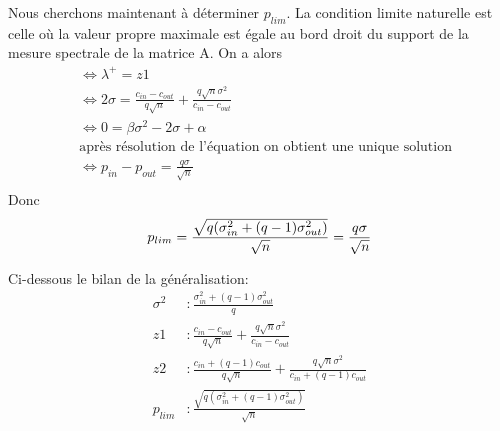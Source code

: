 Nous cherchons maintenant à déterminer $p_{lim}$.
La condition limite naturelle est celle où la valeur propre maximale est égale au bord droit du support de la mesure spectrale de la matrice A.
On a alors 
\begin{align*}
	&\Leftrightarrow \lambda^+ = z1\\
	&\Leftrightarrow 2 \sigma = \frac{c_{in} - c_{out}}{q\sqrt{n}} + \frac{q\sqrt{n}\sigma^2}{c_{in} - c_{out}}\\
	&\Leftrightarrow 0 = \beta \sigma^2 - 2 \sigma + \alpha \\
	&\text{après résolution de l'équation on obtient une unique solution}\\
	&\Leftrightarrow p_{in} - p_{out} = \frac{q\sigma}{\sqrt{n}}  \\
\end{align*}
Donc
\begin{equation}
	p_{lim} = \frac{\sqrt{q(\sigma_{in}^2 + (q-1)\sigma_{out}^2)}}{\sqrt{n}} = \frac{q\sigma}{\sqrt{n}}  \\
\end{equation}


Ci-dessous le bilan de la généralisation:
\begin{align*}
	\sigma^2&: \frac{\sigma_{in}^2 + (q-1)\sigma_{out}^2}{q} \\
	z1&: \frac{c_{in} - c_{out}}{q\sqrt{n}} + \frac{q\sqrt{n}\sigma^2}{c_{in} - c_{out}}\\
	z2&: \frac{c_{in} + (q-1)c_{out}}{q\sqrt{n}} + \frac{q\sqrt{n}\sigma^2}{c_{in} + (q-1)c_{out}}\\
	p_{lim}&: \frac{\sqrt{q(\sigma_{in}^2 + (q-1)\sigma_{out}^2)}}{\sqrt{n}} \\
\end{align*}

